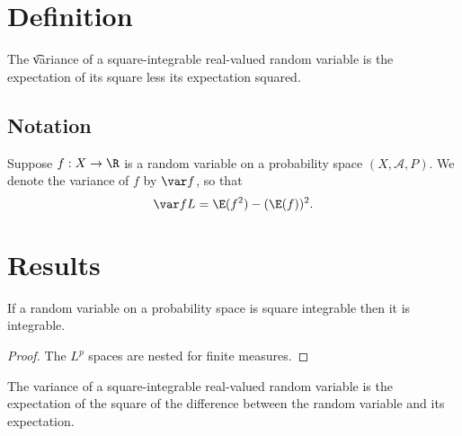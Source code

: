 
\section*{Definition}

The \t{variance} of a square-integrable real-valued random variable is the expectation of its square less its expectation squared.

\subsection*{Notation}

Suppose $f: X \to \R $ is a random variable on a probability space $(X, \mathcal{A} , P)$.
We denote the variance of $f$ by $\var f$, so that
\[
\var f L= \E (f^2) - (\E (f))^2.
\]

\section*{Results}

\begin{proposition}
If a random variable on a probability space is square integrable then it is integrable.
\begin{proof}The $L^p$ spaces are nested
for finite measures.\end{proof}
\end{proposition}

\begin{proposition}
The variance of a square-integrable real-valued random variable is the expectation of the square of the difference between the random variable and its expectation.
\end{proposition}

\blankpage